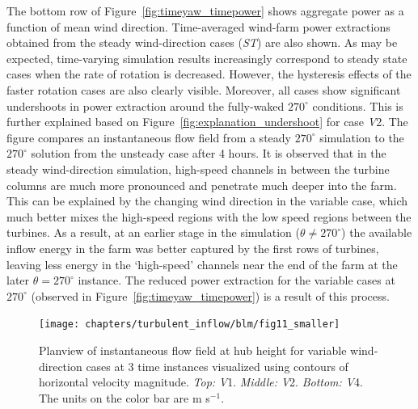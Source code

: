		The bottom row of Figure~\ref{fig:timeyaw_timepower} shows aggregate power as a function of mean wind direction. Time-averaged wind-farm power extractions obtained from the steady wind-direction cases (\emph{ST}) are also shown. As may be expected, time-varying simulation results increasingly correspond to steady state cases when the rate of rotation is decreased. However, the hysteresis effects of the faster rotation cases are also clearly visible. Moreover, all cases show significant undershoots in power extraction around the fully-waked $270^\circ$ conditions. This is further explained based on Figure~\ref{fig:explanation_undershoot} for case \emph{V}2. The figure compares an instantaneous flow field from a steady $270^\circ$ simulation to the $270^\circ$ solution from the unsteady case after 4 hours. It is observed that in the steady wind-direction simulation, high-speed channels in between the turbine columns are much more pronounced and penetrate much deeper into the farm. This can be explained by the changing wind direction in the variable case, which much better mixes the high-speed regions with the low speed regions between the turbines. As a result, at an earlier stage in the simulation ($\theta \neq 270^\circ$) the available inflow energy in the farm was better captured by the first rows of turbines, leaving less energy in the `high-speed' channels near the end of the farm at the later $\theta=270^\circ$ instance. The reduced power extraction for the variable cases at $270^\circ$ (observed in Figure~\ref{fig:timeyaw_timepower}) is a result of this process.
		
		\begin{figure}[ht]
			\centering
			\texttt{[image: chapters/turbulent\_inflow/blm/fig11\_smaller]}
			\caption{Planview of instantaneous flow field at hub height for variable wind-direction cases at 3 time instances visualized using contours of horizontal velocity magnitude. \emph{Top: } \emph{V}1. \emph{Middle: } \emph{V}2. \emph{Bottom: } \emph{V}4. The units on the color bar are m s$^{-1}$.} 
			\label{fig:topviewfarms}
		\end{figure}
		
